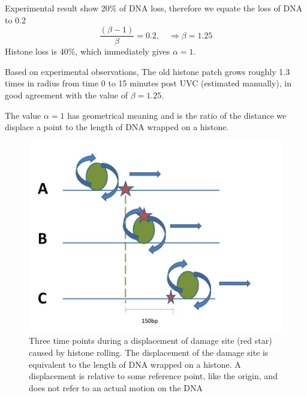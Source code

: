 \documentclass[12pt]{paper}
\begin{document}
     Experimental result show 20\% of DNA loss, therefore we equate the loss of DNA to 0.2 
     \begin{equation*}
     \frac{(\beta -1)}{\beta}=0.2, \quad \Rightarrow \beta = 1.25
     \end{equation*}     
     Histone loss is 40\%, which immediately gives $\alpha =1$.
     
     Based on experimental observations,
     The old histone patch grows roughly 1.3 times in radius from time 0 to 15 minutes post UVC (estimated manually), in good agreement with the value of $\beta =1.25$.
     
     The value $\alpha=1$ has geometrical meaning and is the ratio of the distance we displace a point to the length of DNA wrapped on a histone. 
                        
        
      
	\begin{figure}
	\centering
	\includegraphics[width=0.7\linewidth]{histoneSlidingSingle}
	\caption{{Three time points during a displacement of damage site (red star) caused by histone rolling. The displacement of the damage site is equivalent to the length of DNA wrapped on a histone. A displacement is relative to some reference point, like the origin, and does not refer to an actual motion on the DNA}}
	\label{fig:histoneSlidingSingle}
	\end{figure}
		
\end{document}
